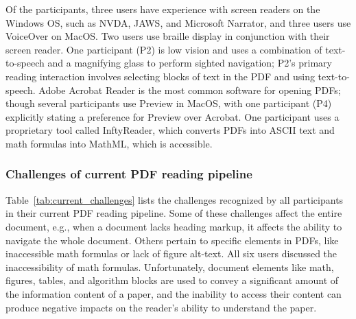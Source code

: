 Of the \numusers participants, three users have experience with screen readers on the Windows OS, such as NVDA, JAWS, and Microsoft Narrator, and three users use VoiceOver on MacOS. Two users use braille display in conjunction with their screen reader. One participant (P2) is low vision and uses a combination of text-to-speech and a magnifying glass to perform sighted navigation; P2's primary reading interaction involves selecting blocks of text in the PDF and using text-to-speech. Adobe Acrobat Reader is the most common software for opening PDFs; though several participants use Preview in MacOS, with one participant (P4) explicitly stating a preference for Preview over Acrobat. One participant uses a proprietary tool called InftyReader, which converts PDFs into ASCII text and math formulas into MathML, which is accessible.

\subsubsection*{Challenges of current PDF reading pipeline}

Table~\ref{tab:current_challenges} lists the challenges recognized by all participants in their current PDF reading pipeline. Some of these challenges affect the entire document, e.g., when a document lacks heading markup, it affects the ability to navigate the whole document. Others pertain to specific elements in PDFs, like inaccessible math formulas or lack of figure alt-text. All six users discussed the inaccessibility of math formulas. Unfortunately, document elements like math, figures, tables, and algorithm blocks are used to convey a significant amount of the information content of a paper, and the inability to access their content can produce negative impacts on the reader's ability to understand the paper.

